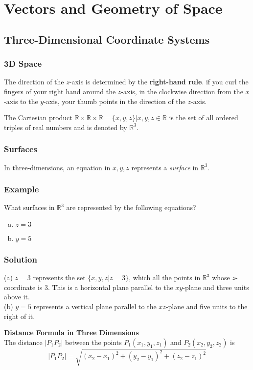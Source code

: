 \chapter{Vectors and Geometry of Space}

\section{Three-Dimensional Coordinate Systems}

\subsection*{3D Space}
The direction of the $z$-axis is determined by the \textbf{right-hand rule}.
if you curl the fingers of your right hand around the $z$-axis, in the clockwise direction
from the $x$-axis to the $y$-axis, your thumb points in the direction of the $z$-axis.

The Cartesian product $\mathbb{R}\times\mathbb{R}\times\mathbb{R}=
    \{x,y,z\} | x,y,z \in \mathbb{R}$ is the set of all ordered triples of real numbers
and is denoted by $\mathbb{R}^3$.

\subsection*{Surfaces}
In three-dimensions, an equation in $x,y,z$ represents a \emph{surface} in $\mathbb{R}^3$.

\subsection*{Example}
What surfaces in $\mathbb{R}^3$ are represented by the following equations?
\begin{enumerate}[(a)]
    \item $z=3$
    \item $y=5$
\end{enumerate}
\subsection*{Solution}
(a) $z=3$ represents the set $\{x,y,z | z=3\}$, which all the points in
$\mathbb{R}^3$ whose $z$-coordinate is 3. This is a horizontal plane parallel
to the $xy$-plane and three units above it. \\
(b) $y=5$ represents a vertical plane parallel to the $xz$-plane and five units
to the right of it.

\textbf{Distance Formula in Three Dimensions} \\
The distance $|P_1P_2|$ between the points $P_1(x_1,y_1,z_1)$ and $P_2(x_2,y_2,z_2)$ is
$$|P_1P_2|=\sqrt{(x_2-x_1)^2+(y_2-y_1)^2+(z_2-z_1)^2}$$

